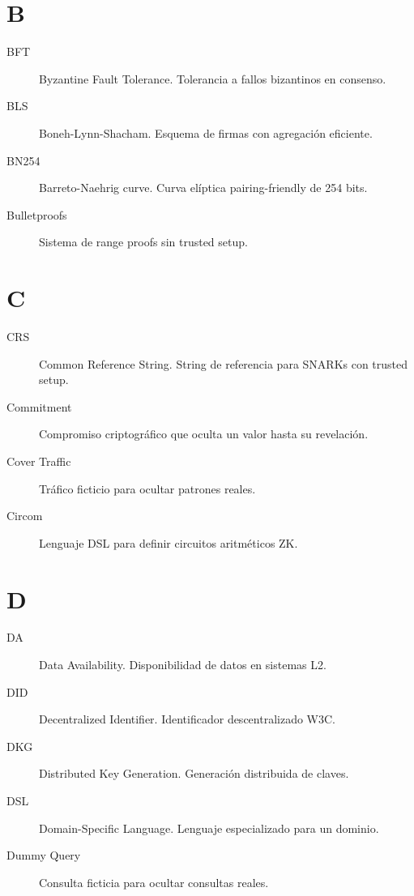 \documentclass[11pt,a4paper,twoside]{book}
\theoremstyle{definition}
\theoremstyle{remark}
\begin{document}
\section*{B}
\begin{description}
\item[BFT] Byzantine Fault Tolerance. Tolerancia a fallos bizantinos en consenso.
\item[BLS] Boneh-Lynn-Shacham. Esquema de firmas con agregación eficiente.
\item[BN254] Barreto-Naehrig curve. Curva elíptica pairing-friendly de 254 bits.
\item[Bulletproofs] Sistema de range proofs sin trusted setup.
\end{description}

\section*{C}
\begin{description}
\item[CRS] Common Reference String. String de referencia para SNARKs con trusted setup.
\item[Commitment] Compromiso criptográfico que oculta un valor hasta su revelación.
\item[Cover Traffic] Tráfico ficticio para ocultar patrones reales.
\item[Circom] Lenguaje DSL para definir circuitos aritméticos ZK.
\end{description}

\section*{D}
\begin{description}
\item[DA] Data Availability. Disponibilidad de datos en sistemas L2.
\item[DID] Decentralized Identifier. Identificador descentralizado W3C.
\item[DKG] Distributed Key Generation. Generación distribuida de claves.
\item[DSL] Domain-Specific Language. Lenguaje especializado para un dominio.
\item[Dummy Query] Consulta ficticia para ocultar consultas reales.
\end{description}
\end{document}
